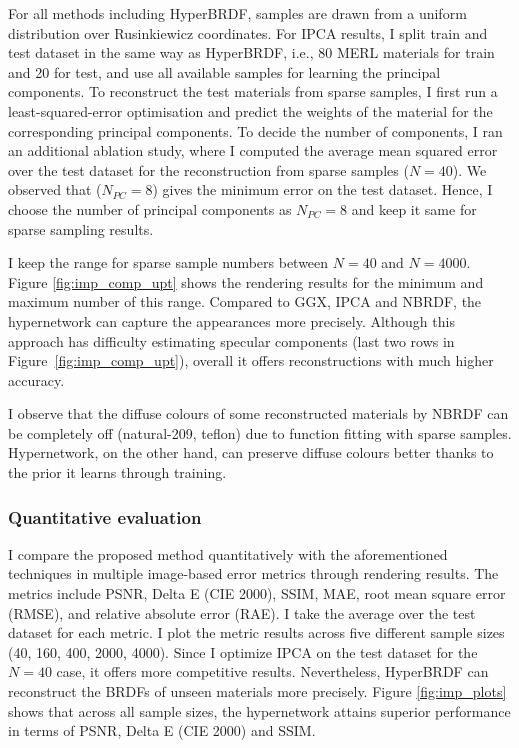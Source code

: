 For all methods including HyperBRDF, samples are drawn from a uniform distribution over Rusinkiewicz coordinates. For IPCA results, I split train and test dataset in the same way as HyperBRDF, i.e., 80 MERL materials for train and 20 for test, and use all available samples for learning the principal components. To reconstruct the test materials from sparse samples, I first run a least-squared-error optimisation and predict the weights of the material for the corresponding principal components. To decide the number of components, I ran an additional ablation study, where 
I computed the average mean squared error over the test dataset for the reconstruction from sparse samples ($N = 40$). We observed that ($N_{PC} = 8$) gives the minimum error on the test dataset. Hence, I choose the number of principal components as $N_{PC} = 8$ and keep it same for sparse sampling results.

 
I keep the range for sparse sample numbers between $N = 40$ and $N = 4000$. Figure \ref{fig:imp_comp_upt} shows the rendering results for the minimum and maximum number of this range. Compared to GGX, IPCA and NBRDF, the hypernetwork can capture the appearances more precisely. Although this approach has difficulty estimating specular components (last two rows in Figure~\ref{fig:imp_comp_upt}), overall it offers reconstructions with much higher accuracy. 

I observe that the diffuse colours of some reconstructed materials by NBRDF can be completely off (natural-209, teflon) due to function fitting with sparse samples. Hypernetwork, on the other hand, can preserve diffuse colours better thanks to the prior it learns through training.


\subsubsection{Quantitative evaluation}

I compare the proposed method quantitatively with the aforementioned techniques in multiple image-based error metrics through rendering results. The metrics include \gls{PSNR}, Delta E (CIE 2000), \gls{SSIM}, \gls{MAE}, root mean square error (RMSE), and relative absolute error (RAE). I take the average over the test dataset for each metric. I plot the metric results across five different sample sizes (40, 160, 400, 2000, 4000). Since I optimize IPCA on the test dataset for the $N = 40$ case, it offers more competitive results. Nevertheless, HyperBRDF can reconstruct the \gls{BRDF}s of unseen materials more precisely. Figure \ref{fig:imp_plots} shows that across all sample sizes, the hypernetwork attains superior performance in terms of \gls{PSNR}, Delta E (CIE 2000) and \gls{SSIM}. 

